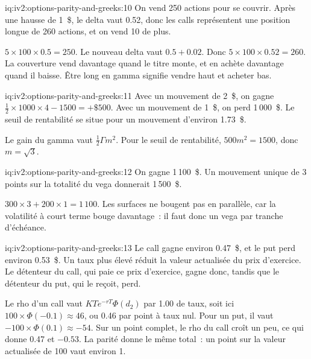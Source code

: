 \begin{solution}{iq:iv2:options-parity-and-greeks:10}
On vend 250 actions pour se couvrir. Après une hausse de 1~\$, le delta vaut 0.52, donc les calls représentent une position longue de 260 actions, et on vend 10 de plus.

$5 \times 100 \times 0.5 = 250$. Le nouveau delta vaut $0.5 + 0.02$. Donc $5 \times 100 \times 0.52 = 260$. La couverture vend davantage quand le titre monte, et en achète davantage quand il baisse. Être long en gamma signifie vendre haut et acheter bas.

\end{solution}

\begin{solution}{iq:iv2:options-parity-and-greeks:11}
Avec un mouvement de 2~\$, on gagne $\tfrac12 \times 1000 \times 4 - 1500 = +\$500$. Avec un mouvement de 1~\$, on perd 1\,000~\$. Le seuil de rentabilité se situe pour un mouvement d'environ 1.73~\$.

Le gain du gamma vaut $\tfrac12\Gamma m^2$. Pour le seuil de rentabilité, $500m^2 = 1500$, donc $m = \sqrt 3$.

\end{solution}

\begin{solution}{iq:iv2:options-parity-and-greeks:12}
On gagne 1\,100~\$. Un mouvement unique de 3 points sur la totalité du vega donnerait 1\,500~\$.

$300 \times 3 + 200 \times 1 = 1\,100$. Les surfaces ne bougent pas en parallèle, car la volatilité à court terme bouge davantage~: il faut donc un vega par tranche d'échéance.

\end{solution}

\begin{solution}{iq:iv2:options-parity-and-greeks:13}
Le call gagne environ 0.47~\$, et le put perd environ 0.53~\$. Un taux plus élevé réduit la valeur actualisée du prix d'exercice. Le détenteur du call, qui paie ce prix d'exercice, gagne donc, tandis que le détenteur du put, qui le reçoit, perd.

Le rho d'un call vaut $KTe^{-rT}\Phi(d_2)$ par 1.00 de taux, soit ici $100 \times \Phi(-0.1) \approx 46$, ou 0.46 par point à taux nul. Pour un put, il vaut $-100 \times \Phi(0.1) \approx -54$. Sur un point complet, le rho du call croît un peu, ce qui donne 0.47 et $-0.53$. La parité donne le même total~: un point sur la valeur actualisée de 100 vaut environ 1.

\end{solution}

